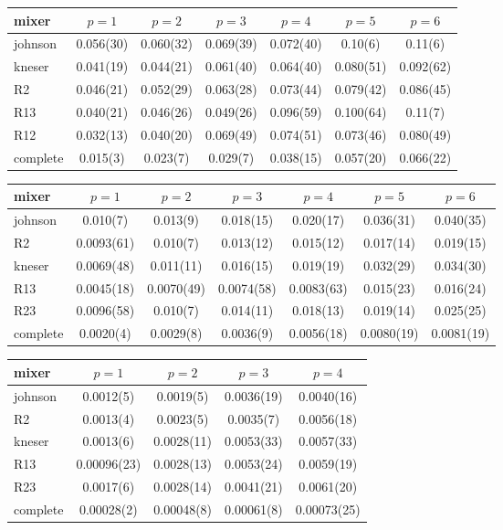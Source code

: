 \begin{tabular}{lcccccc}
mixer & $p=1$ & $p=2$ & $p=3$ & $p=4$ & $p=5$ & $p=6$ \\
\hline
johnson & 0.056(30) & 0.060(32) & 0.069(39) & 0.072(40) & 0.10(6) & 0.11(6) \\
kneser & 0.041(19) & 0.044(21) & 0.061(40) & 0.064(40) & 0.080(51) & 0.092(62) \\
R2 & 0.046(21) & 0.052(29) & 0.063(28) & 0.073(44) & 0.079(42) & 0.086(45) \\
R13 & 0.040(21) & 0.046(26) & 0.049(26) & 0.096(59) & 0.100(64) & 0.11(7) \\
R12 & 0.032(13) & 0.040(20) & 0.069(49) & 0.074(51) & 0.073(46) & 0.080(49) \\
complete & 0.015(3) & 0.023(7) & 0.029(7) & 0.038(15) & 0.057(20) & 0.066(22) \\
\end{tabular}

\begin{tabular}{lcccccc}
mixer & $p=1$ & $p=2$ & $p=3$ & $p=4$ & $p=5$ & $p=6$ \\
\hline
johnson & 0.010(7) & 0.013(9) & 0.018(15) & 0.020(17) & 0.036(31) & 0.040(35) \\
R2 & 0.0093(61) & 0.010(7) & 0.013(12) & 0.015(12) & 0.017(14) & 0.019(15) \\
kneser & 0.0069(48) & 0.011(11) & 0.016(15) & 0.019(19) & 0.032(29) & 0.034(30) \\
R13 & 0.0045(18) & 0.0070(49) & 0.0074(58) & 0.0083(63) & 0.015(23) & 0.016(24) \\
R23 & 0.0096(58) & 0.010(7) & 0.014(11) & 0.018(13) & 0.019(14) & 0.025(25) \\
complete & 0.0020(4) & 0.0029(8) & 0.0036(9) & 0.0056(18) & 0.0080(19) & 0.0081(19) \\
\end{tabular}

\begin{tabular}{lcccc}
mixer & $p=1$ & $p=2$ & $p=3$ & $p=4$ \\
\hline
johnson & 0.0012(5) & 0.0019(5) & 0.0036(19) & 0.0040(16) \\
R2 & 0.0013(4) & 0.0023(5) & 0.0035(7) & 0.0056(18) \\
kneser & 0.0013(6) & 0.0028(11) & 0.0053(33) & 0.0057(33) \\
R13 & 0.00096(23) & 0.0028(13) & 0.0053(24) & 0.0059(19) \\
R23 & 0.0017(6) & 0.0028(14) & 0.0041(21) & 0.0061(20) \\
complete & 0.00028(2) & 0.00048(8) & 0.00061(8) & 0.00073(25) \\
\end{tabular}

